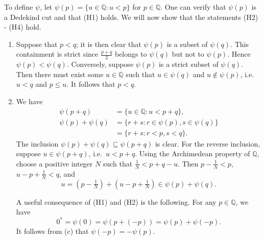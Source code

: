 \documentclass[12pt]{article}
\newcommand{\newp}{\vspace{5mm}}
\theoremstyle{definition}
\begin{document}
\newp

To define \( \psi \), let \( \psi(p) = \{ u \in \mathbb{Q} : u < p \} \) for \( p \in \mathbb{Q} \). One can verify that \( \psi(p) \) is a Dedekind cut and that (H1) holds. We will now show that the statements (H2) - (H4) hold.

\begin{enumerate}[label = (H\arabic*), start = 2]
    \item Suppose that \( p < q \); it is then clear that \( \psi(p) \) is a subset of \( \psi(q) \). This containment is strict since \( \tfrac{p + q}{2} \) belongs to \( \psi(q) \) but not to \( \psi(p) \). Hence \( \psi(p) < \psi(q) \). Conversely, suppose \( \psi(p) \) is a strict subset of \( \psi(q) \). Then there must exist some \( u \in \mathbb{Q} \) such that \( u \in \psi(q) \) and \( u \not\in \psi(p) \), i.e.\ \( u < q \) and \( p \leq u \). It follows that \( p < q \).

    \item We have
    \begin{align*}
        \psi(p + q) &= \{ u \in \mathbb{Q} : u < p + q \}, \\
        \psi(p) + \psi(q) &= \{ r + s : r \in \psi(p), s \in \psi(q) \} \\
        &= \{ r + s : r < p, s < q \}.
    \end{align*}
    The inclusion \( \psi(p) + \psi(q) \subseteq \psi(p + q) \) is clear. For the reverse inclusion, suppose \( u \in \psi(p + q) \), i.e.\ \( u < p + q \). Using the Archimedean property of \( \mathbb{Q} \), choose a positive integer \( N \) such that \( \tfrac{1}{N} < p + q - u \). Then \( p - \tfrac{1}{N} < p \), \( u - p + \tfrac{1}{N} < q \), and
    \[
        u = \left(p - \tfrac{1}{N}\right) + \left(u - p + \tfrac{1}{N}\right) \in \psi(p) + \psi(q).
    \]

    A useful consequence of (H1) and (H2) is the following. For any \( p \in \mathbb{Q} \), we have
    \[
        0^* = \psi(0) = \psi(p + (-p)) = \psi(p) + \psi(-p).
    \]
    It follows from  (c) that \( \psi(-p) = -\psi(p) \).


\end{enumerate}
\end{document}

